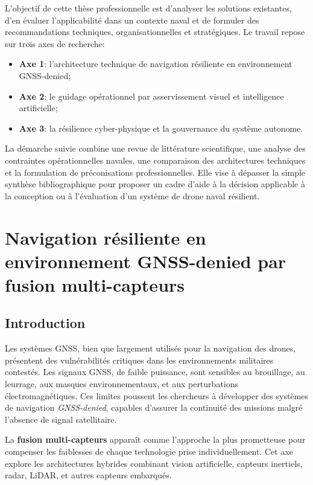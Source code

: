 \documentclass[12pt, a4paper, twoside, openright]{report}
\begin{document}
L’objectif de cette thèse professionnelle est d’analyser les solutions existantes, d’en évaluer l’applicabilité dans un contexte naval et de formuler des recommandations techniques, organisationnelles et stratégiques. Le travail repose sur trois axes de recherche:
\begin{itemize}
    \item \textbf{Axe 1}: l’architecture technique de navigation résiliente en environnement GNSS-denied;
    \item \textbf{Axe 2}: le guidage opérationnel par asservissement visuel et intelligence artificielle;
    \item \textbf{Axe 3}: la résilience cyber-physique et la gouvernance du système autonome.
\end{itemize}

La démarche suivie combine une revue de littérature scientifique, une analyse des contraintes opérationnelles navales, une comparaison des architectures techniques et la formulation de préconisations professionnelles. Elle vise à dépasser la simple synthèse bibliographique pour proposer un cadre d’aide à la décision applicable à la conception ou à l’évaluation d’un système de drone naval résilient.

\cleardoublepage
\chapter{Navigation résiliente en environnement GNSS-denied par fusion multi-capteurs}\label{chap:axe1}

\section{Introduction}
Les systèmes GNSS, bien que largement utilisés pour la navigation des drones, présentent des vulnérabilités critiques dans les environnements militaires contestés. Les signaux GNSS, de faible puissance, sont sensibles au brouillage, au leurrage, aux masques environnementaux, et aux perturbations électromagnétiques. Ces limites poussent les chercheurs à développer des systèmes de navigation \textit{GNSS-denied}, capables d’assurer la continuité des missions malgré l’absence de signal satellitaire.

La \textbf{fusion multi-capteurs} apparaît comme l’approche la plus prometteuse pour compenser les faiblesses de chaque technologie prise individuellement. Cet axe explore les architectures hybrides combinant vision artificielle, capteurs inertiels, radar, LiDAR, et autres capteurs embarqués.
\end{document}
